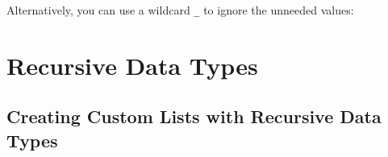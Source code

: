 \begin{Shaded}
\begin{Highlighting}[]
  \OtherTok{{-}\textgreater{}}  \OtherTok{{-}\textgreater{}} 

                \OtherTok{=} 
\OtherTok{=} 
\OtherTok{=}\OperatorTok{\textgreater{}}
\OtherTok{=}\OperatorTok{\textless{}}
\end{Highlighting}
\end{Shaded}

Alternatively, you can use a wildcard \texttt{\_} to ignore the unneeded
values:

\begin{Shaded}
\begin{Highlighting}[]
  \OtherTok{{-}\textgreater{}}  \OtherTok{{-}\textgreater{}} 

              \OtherTok{=} 
\NormalTok{ \_) }\OtherTok{=} 
\OtherTok{=}\OperatorTok{\textgreater{}}
\OtherTok{=}\OperatorTok{\textless{}}
\end{Highlighting}
\end{Shaded}

\hypertarget{recursive-data-types}{%
\section{Recursive Data Types}\label{recursive-data-types}}

\hypertarget{creating-custom-lists-with-recursive-data-types}{%
\subsection{Creating Custom Lists with Recursive Data
Types}\label{creating-custom-lists-with-recursive-data-types}}

